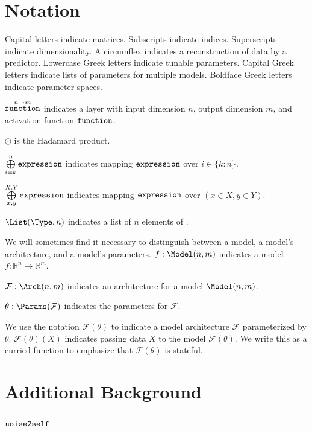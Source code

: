 \appendix

\section{Notation}
\label{app:notation}
Capital letters indicate matrices. Subscripts indicate indices. Superscripts indicate dimensionality.
A circumflex indicates a reconstruction of data by a predictor. Lowercase Greek letters indicate tunable parameters.
Capital Greek letters indicate lists of parameters for multiple models.
Boldface Greek letters indicate parameter spaces.

$\mathop{\mathtt{function}}\limits^{n \to m}$ indicates a layer with input dimension $n$, output dimension $m$, and activation function $\mathop{\mathtt{function}}\limits$.

$\odot$ is the Hadamard product.

$\mathop{\bigoplus}\limits^n_{i=k}\mathop{\mathtt{expression}}\limits$ indicates mapping $\mathop{\mathtt{expression}}\limits$ over $i \in \{k:n\}$.

$\mathop{\bigoplus}\limits^{X,Y}_{x,y}\mathop{\mathtt{expression}}\limits$ indicates mapping $\mathop{\mathtt{expression}}\limits$ over $(x \in X,y \in Y)$.

$\List(\Type,n)$ indicates a list of $n$ elements of \Type.

We will sometimes find it necessary to distinguish between a model, a model's architecture, and a model's parameters.
$f:\Model(n,m)$ indicates a model $f:\mathbb{R}^n \to \mathbb{R}^m$.

$\mathcal{F}:\Arch(n,m)$ indicates an architecture for a model $\Model(n,m)$.

$\theta:\Params(\mathcal{F})$ indicates the parameters for $\mathcal{F}$.

We use the notation $\mathcal{F}(\theta)$ to indicate a model architecture $\mathcal{F}$ parameterized by $\theta$.
$\mathcal{F}(\theta)(X)$ indicates passing data $X$ to the model $\mathcal{F}(\theta)$.
We write this as a curried function to emphasize that $\mathcal{F}(\theta)$ is stateful.

\section{Additional Background}

\subsection{$\mathop{\mathtt{noise2self}}\limits$}
\label{app:ntos}


